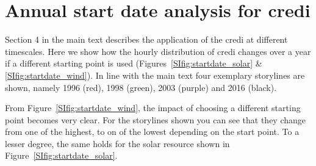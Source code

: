 \documentclass[a4paper,11pt]{extarticle}
\newcommand{\credi}[0]{{\sc credi}}
\begin{document}
\section{Annual start date analysis for \credi}\label{app:startdate}
Section 4 in the main text describes the application of the \credi{} at different timescales. 
Here we show how the hourly distribution of \credi{} changes over a year if a different starting point is used (Figures~\ref{SIfig:startdate_solar} \& \ref{SIfig:startdate_wind}). 
In line with the main text four exemplary storylines are shown, namely 1996 (red), 1998 (green), 2003 (purple) and 2016 (black).

From Figure~\ref{SIfig:startdate_wind}, the impact of choosing a different starting point becomes very clear.  
For the storylines shown you can see that they change from one of the highest, to on of the lowest depending on the start point. 
To a lesser degree, the same holds for the solar resource shown in  Figure~\ref{SIfig:startdate_solar}.
\end{document}
